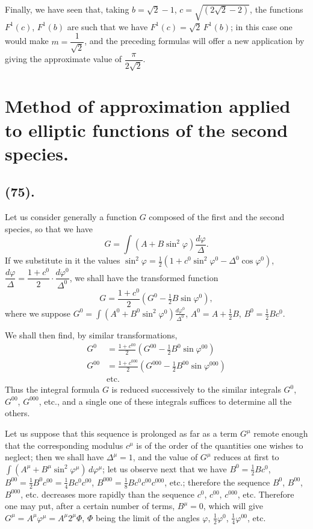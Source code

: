 \documentclass{article}
\begin{document}
Finally, we have seen that, taking $b=\sqrt{2}-1$, $c=\sqrt{(2\sqrt{2}-2)}$, the functions $F^{1}(c)$, $F^{1}(b)$ are such that we have $F^{1}(c)=\sqrt{2}\,F^{1}(b)$; in this case one would make $m=\dfrac{1}{\sqrt{2}}$, and the preceding formulas will offer a new application by giving the approximate value of $\dfrac{\pi}{2\sqrt{2}}$.

\section*{Method of approximation applied to elliptic functions of the second species.}

\subsection*{(75).}

Let us consider generally a function $G$ composed of the first and the second species, so that we have
\[ G=\int(A+B\sin^{2}\varphi)\frac{d\varphi}{\Delta}. \]
If we substitute in it the values $\sin^{2}\varphi=\frac{1}{2}(1+c^{0}\sin^{2}\varphi^{0}-\Delta^{0}\cos\varphi^{0})$, $\dfrac{d\varphi}{\Delta}=\dfrac{1+c^{0}}{2}\cdot\dfrac{d\varphi^{0}}{\Delta^{0}}$, we shall have the transformed function
\[ G=\frac{1+c^{0}}{2}(G^{0}-\tfrac{1}{2}B\sin\varphi^{0}), \]
where we suppose $G^{0}=\displaystyle\int(A^{0}+B^{0}\sin^{2}\varphi^{0})\frac{d\varphi^{0}}{\Delta^{0}}$, $A^{0}=A+\frac{1}{2}B$, $B^{0}=\frac{1}{2}Bc^{0}$.

We shall then find, by similar transformations,
\[ \begin{aligned} G^{0}&=\frac{1+c^{00}}{2}(G^{00}-\tfrac{1}{2}B^{0}\sin\varphi^{00})\\ G^{00}&=\frac{1+c^{000}}{2}(G^{000}-\tfrac{1}{2}B^{00}\sin\varphi^{000})\\ &\text{etc.} \end{aligned} \]
Thus the integral formula $G$ is reduced successively to the similar integrals $G^{0}$, $G^{00}$, $G^{000}$, etc., and a single one of these integrals suffices to determine all the others.

Let us suppose that this sequence is prolonged as far as a term $G^{\mu}$ remote enough that the corresponding modulus $c^{\mu}$ is of the order of the quantities one wishes to neglect; then we shall have $\Delta^{\mu}=1$, and the value of $G^{\mu}$ reduces at first to $\displaystyle\int(A^{\mu}+B^{\mu}\sin^{2}\varphi^{\mu})\,d\varphi^{\mu}$; let us observe next that we have $B^{0}=\frac{1}{2}Bc^{0}$, $B^{00}=\frac{1}{2}B^{0}c^{00}=\frac{1}{4}Bc^{0}c^{00}$, $B^{000}=\frac{1}{8}Bc^{0}c^{00}c^{000}$, etc.; therefore the sequence $B^{0}$, $B^{00}$, $B^{000}$, etc. decreases more rapidly than the sequence $c^{0}$, $c^{00}$, $c^{000}$, etc. Therefore one may put, after a certain number of terms, $B^{\mu}=0$, which will give $G^{\mu}=A^{\mu}\varphi^{\mu}=A^{\mu}2^{\mu}\Phi$, $\Phi$ being the limit of the angles $\varphi$, $\frac{1}{2}\varphi^{0}$, $\frac{1}{4}\varphi^{00}$, etc.
\end{document}
